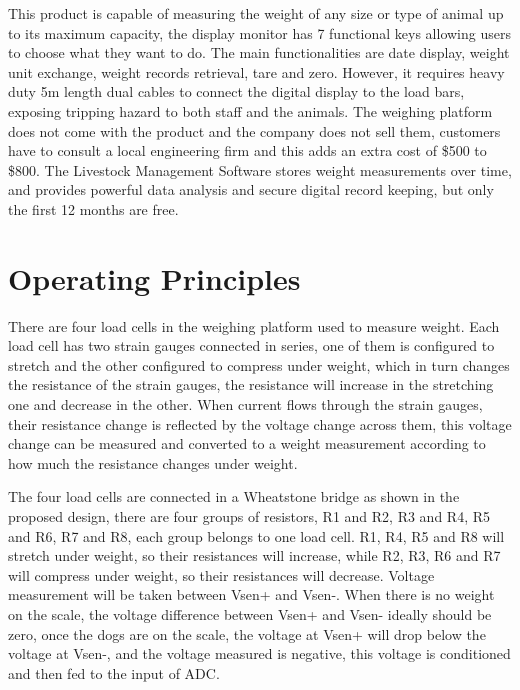 This product is capable of measuring the weight of any size or type of animal up to its maximum capacity, the display monitor has 7 functional keys allowing users to choose what they want to do. The main functionalities are date display, weight unit exchange, weight records retrieval, tare and zero. However, it requires heavy duty 5m length dual cables to connect the digital display to the load bars, exposing tripping hazard to both staff and the animals. The weighing platform does not come with the product and the company does not sell them, customers have to consult a local engineering firm and this adds an extra cost of \$500 to \$800. The Livestock Management Software stores weight measurements over time, and provides powerful data analysis and secure digital record keeping, but only the first 12 months are free.

\section{Operating Principles}
There are four load cells in the weighing platform used to measure weight. Each load cell has two strain gauges connected in series, one of them is configured to stretch and the other configured to compress under weight, which in turn changes the resistance of the strain gauges, the resistance will increase in the stretching one and decrease in the other. When current flows through the strain gauges, their resistance change is reflected by the voltage change across them, this voltage change can be measured and converted to a weight measurement according to how much the resistance changes under weight.

The four load cells are connected in a Wheatstone bridge as shown in the proposed design, there are four groups of resistors, R1 and R2, R3 and R4, R5 and R6, R7 and R8, each group belongs to one load cell. R1, R4, R5 and R8 will stretch under weight, so their resistances will increase, while R2, R3, R6 and R7 will compress under weight, so their resistances will decrease. Voltage measurement will be taken between Vsen+ and Vsen-. When there is no weight on the scale, the voltage difference between Vsen+ and Vsen- ideally should be zero, once the dogs are on the scale, the voltage at Vsen+ will drop below the voltage at Vsen-, and the voltage measured is negative, this voltage is conditioned and then fed to the input of ADC.

